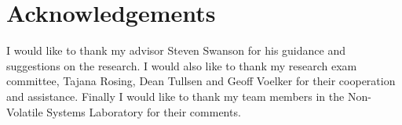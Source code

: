 \section{Acknowledgements}
\label{sec:acknowledge}

I would like to thank my advisor Steven Swanson for his guidance and suggestions
on the research. I would also like to thank my research exam committee, Tajana
Rosing, Dean Tullsen and Geoff Voelker for their cooperation and assistance.
Finally I would like to thank my team members in the Non-Volatile Systems
Laboratory for their comments.

